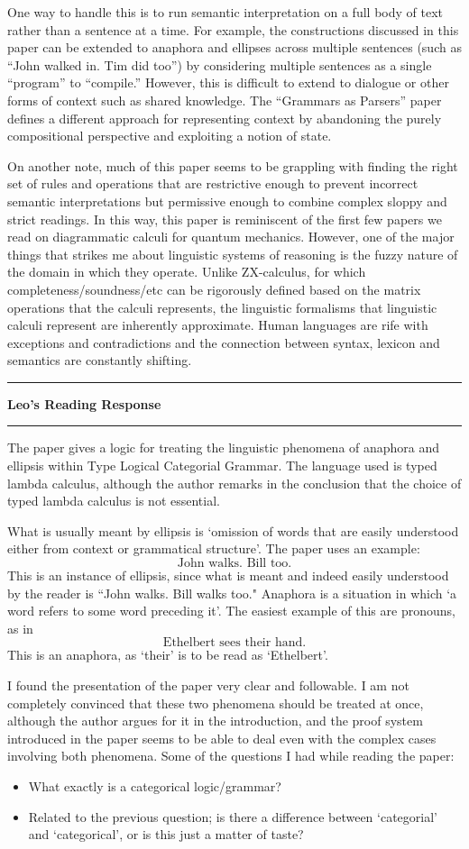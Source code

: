 \documentclass{amsart}
\newcommand{\iam}[1]{
  \vspace{0.25em}
  \hrule
  \vspace{0.25em}
  \textbf{{#1}'s Reading Response}
  \vspace{0.25em}
  \hrule
  \vspace{1em}
}
\begin{document}
One way to handle this is to run semantic interpretation on a full body of text rather than a sentence at a time. For example, the constructions discussed in this paper can be extended to anaphora and ellipses across multiple sentences (such as ``John walked in. Tim did too'') by considering multiple sentences as a single ``program'' to ``compile.'' However, this is difficult to extend to dialogue or other forms of context such as shared knowledge. The ``Grammars as Parsers'' paper defines a different approach for representing context by abandoning the purely compositional perspective and exploiting a notion of state.

On another note, much of this paper seems to be grappling with finding the right set of rules and operations that are restrictive enough to prevent incorrect semantic interpretations but permissive enough to combine complex sloppy and strict readings. In this way, this paper is reminiscent of the first few papers we read on diagrammatic calculi for quantum mechanics. However, one of the major things that strikes me about linguistic systems of reasoning is the fuzzy nature of the domain in which they operate. Unlike ZX-calculus, for which completeness/soundness/etc can be rigorously defined based on the matrix operations that the calculi represents, the linguistic formalisms that linguistic calculi represent are inherently approximate. Human languages are rife with exceptions and contradictions and the connection between syntax, lexicon and semantics are constantly shifting.

\iam{Leo}
The paper gives a logic for treating the linguistic phenomena of anaphora and ellipsis within Type Logical Categorial Grammar. The language used is typed lambda calculus, although the author remarks in the conclusion that the choice of typed lambda calculus is not essential.

What is usually meant by ellipsis is `omission of words that are easily understood either from context or grammatical structure'. The paper uses an example:
$$\textrm{John walks. Bill too.}$$
This is an instance of ellipsis, since what is meant and indeed easily understood by the reader is ``John walks. Bill walks too." Anaphora is a situation in which `a word refers to some word preceding it'. The easiest example of this are pronouns, as in
$$\textrm{Ethelbert sees their hand.}$$
This is an anaphora, as `their' is to be read as `Ethelbert'.

I found the presentation of the paper very clear and followable. I am not completely convinced that these two phenomena should be treated at once, although the author argues for it in the introduction, and the proof system introduced in the paper seems to be able to deal even with the complex cases involving both phenomena. Some of the questions I had while reading the paper:
\begin{itemize}
\item What exactly is a categorical logic/grammar?
\item Related to the previous question; is there a difference between `categorial' and `categorical', or is this just a matter of taste?
\end{itemize}
\end{document}
